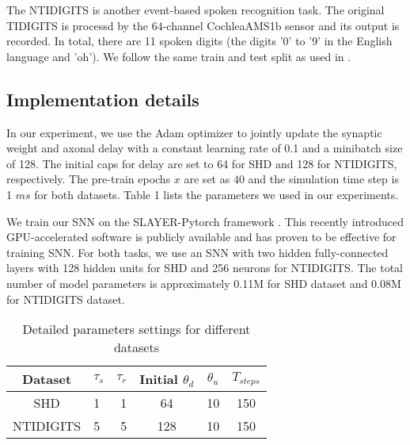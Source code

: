 \documentclass{article}
\begin{document}
The NTIDIGITS is another event-based spoken recognition task. The original TIDIGITS is processd by the 64-channel CochleaAMS1b sensor and its output is recorded. In total, there are 11 spoken digits (the digits '0' to '9' in the English language and 'oh'). We follow the same train and test split as used in \cite{anumula2018feature}.
\iffalse
\begin{figure}
\centering
\texttt{[image: figure/input\_shd2.png]}
	\caption{An English spoken "2" example from SHD datasets. The Y-axis represents channels from 0 to 699 and X-axis represents time in $ms$ resolution.  }
\label{fig:example1}
\end{figure}
\fi
\subsection{Implementation details} 
In our experiment, we use the Adam optimizer to jointly update the synaptic weight and axonal delay with a constant learning rate of 0.1 and a minibatch size of 128. The initial caps for delay are set to 64 for SHD and 128 for NTIDIGITS, respectively. The pre-train epochs $x$ are set as $40$ and the simulation time step is 1 $ms$  for both datasets. Table 1 lists  the parameters we used in our experiments.

We train our SNN on the SLAYER-Pytorch framework \cite{Shrestha2018}. This recently introduced GPU-accelerated software is publicly available and has proven to be effective for training SNN. For both tasks, we use an SNN with two hidden fully-connected layers with 128 hidden units for SHD and 256 neurons for NTIDIGITS. The total number of model parameters is approximately 0.11M for SHD dataset and 0.08M for NTIDIGITS dataset.\\

\vspace{-0.5cm}
\begin{table}[ht]
\small
	\centering
	\caption{
Detailed parameters settings for different datasets}
	\label{tbl:param}
	\begin{tabular}{clrccc}
		\cline{1-6}
		\multicolumn{1}{c}{\bf Dataset}& \multicolumn{1}{c}{\bf $\tau_s$} & \multicolumn{1}{c}{\bf $\tau_r$} & \textbf{Initial $\theta_{d}$}  &\textbf{$\theta_{u}$}&$T_{steps}$
		\\ \hline
	\multirow{1}{*}{{SHD}}
		& 1 	& 1  & 64&10&150 \\
\multirow{1}{*}{{NTIDIGITS}}
		&  5		& 5 & 128&10&150 \\
		\hline
	\end{tabular}
	\vspace{-0.5cm}
\end{table}\textbf{}
\end{document}
